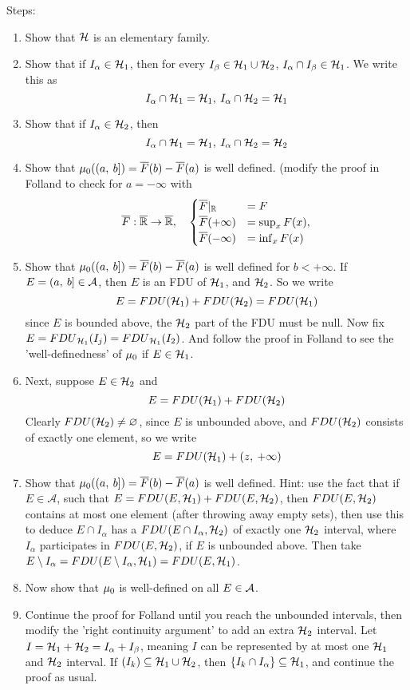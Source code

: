 \documentclass[../../main.tex]{subfiles}
\begin{document}
Steps:
\begin{enumerate}
\item Show that $\mathcal{H}$ is an elementary family.
\item Show that if $I_\alpha\in\mathcal{H}_1$, then for every $I_\beta\in\mathcal{H}_1\cup\mathcal{H}_2$, $I_\alpha\cap I_\beta \in\mathcal{H}_1$. We write this as 
\[
I_\alpha\cap\mathcal{H}_1 = \mathcal{H}_1,\: I_\alpha\cap\mathcal{H}_2 = \mathcal{H}_1
\]
\item Show that if $I_\alpha\in\mathcal{H}_2$, then
\[
I_\alpha\cap\mathcal{H}_1 = \mathcal{H}_1,\: I_\alpha\cap\mathcal{H}_2 = \mathcal{H}_2
\]
\item Show that $\mu_0((a,\: b]) = \overline{F}(b) - \overline{F}(a)$ is well defined. (modify the proof in Folland to check for $a = -\infty$ with
\[
\overline{F}:\overline{\mathbb{R}}\to\overline{\mathbb{R}},\quad \begin{cases}\overline{F}|_{\mathbb{R}} &= F\\ \overline{F}(+\infty) &= \sup_x F(x),\\  \overline{F}(-\infty) &=\inf_x F(x)\end{cases}
\]
\item Show that $\mu_0((a,\: b]) = \overline{F}(b) - \overline{F}(a)$ is well defined for $b < +\infty$. If $E = (a,\: b]\in\mathcal{A}$, then $E$ is an FDU of $\mathcal{H}_1$, and $\mathcal{H}_2$. So we write
\[
    E = FDU(\mathcal{H}_1) + FDU(\mathcal{H}_2) = FDU(\mathcal{H}_1)
\]
since $E$ is bounded above, the $\mathcal{H}_2$ part of the FDU must be null. Now fix $E = {FDU}_{\mathcal{H}_1}(I_j) = {FDU}_{\mathcal{H}_1}(I_2)$. And follow the proof in Folland to see the 'well-definedness' of $\mu_0$ if $E\in\mathcal{H}_1$.
\item Next, suppose $E \in\mathcal{H}_2$ and 
\[
    E = FDU(\mathcal{H}_1) + FDU(\mathcal{H}_2)
\]
Clearly $FDU(\mathcal{H}_2)\neq\varnothing$, since $E$ is unbounded above, and $FDU(\mathcal{H}_2)$ consists of exactly one element, so we write
\[
    E = FDU(\mathcal{H}_1) + (z,\: +\infty)
\]
\item Show that $\mu_0((a,\: b]) = \overline{F}(b)- \overline{F}(a)$ is well defined. Hint: use the fact that if $E\in\mathcal{A}$, such that $E = FDU(E,\mathcal{H}_1) + FDU(E,\mathcal{H}_2)$, then $FDU(E,\mathcal{H}_2)$ contains at most one element (after throwing away empty sets), then use this to deduce $E\cap I_\alpha$ has a $FDU(E\cap I_\alpha, \mathcal{H}_2)$ of exactly one $\mathcal{H}_2$ interval, where $I_\alpha$ participates in $FDU(E,\mathcal{H}_2)$, if $E$ is unbounded above. Then take $E\setminus I_\alpha = FDU(E\setminus I_\alpha,\mathcal{H}_1) = FDU(E,\mathcal{H}_1)$.
\item Now show that $\mu_0$ is well-defined on all $E\in\mathcal{A}$.
\item Continue the proof for Folland until you reach the unbounded intervals, then modify the 'right continuity argument' to add an extra $\mathcal{H}_2$ interval. Let $I = \mathcal{H}_1 + \mathcal{H}_2 = I_\alpha + I_\beta$, meaning $I$ can be represented by at most one $\mathcal{H}_1$ and $\mathcal{H}_2$ interval. If $(I_k)\subseteq\mathcal{H}_1\cup\mathcal{H}_2$, then $\{I_k\cap I_\alpha\}\subseteq\mathcal{H}_1$, and continue the proof as usual. 
\end{enumerate}
\end{document}
